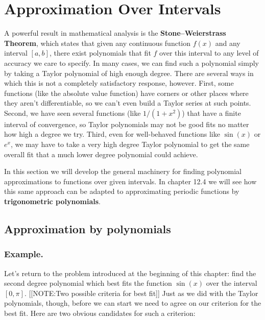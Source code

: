 \section{Approximation Over Intervals}
\label{sec:approximation-over-intervals}

A powerful result in mathematical analysis is the {\bf
  Stone--Weierstrass Theorem}, which
states that given any continuous function $f(x)$ and any
interval $[a, b]$, there exist polynomials that fit $f$ over this
interval to any level of accuracy we care to specify. In many cases,
we can find such a polynomial simply by taking a Taylor polynomial of
high enough degree.  There are several ways in which this is not a
completely satisfactory response, however. First, some functions (like
the absolute value function) have corners or other places where they
aren't differentiable, so we can't even build a Taylor series at such
points. Second, we have seen several functions (like $1/(1+x^2)$)
that have a finite interval of convergence, so Taylor polynomials may
not be good fits no matter how high a degree we try.  Third, even for
well-behaved functions like $\sin(x)$ or $e^x$, we may have to take a
very high degree Taylor polynomial to get the same overall fit that a
much lower degree polynomial could achieve.

In this section we will develop the general machinery for finding
polynomial approximations to functions over given intervals.  In
chapter 12.4 we will see how this same approach can be adapted to
approximating periodic functions by {\bf trigonometric polynomials}.

\subsection{Approximation by polynomials}
\label{subsec:approximation-by-polynomials}

\subsubsection{Example.}
Let's return to the problem introduced at the
beginning of this chapter: find the second degree polynomial which
best fits the function $\sin(x)$ over the interval $[0, \pi]$.
[[NOTE:Two possible criteria for best fit]]
Just as we did with the Taylor polynomials, though, before we can
start we need to agree on our criterion for the best fit. Here are two
obvious candidates for such a criterion:


